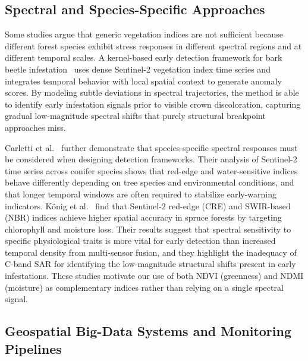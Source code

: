 \subsection{Spectral and Species-Specific Approaches}

Some studies argue that generic vegetation indices are not sufficient because different forest species exhibit stress responses in different spectral regions and at different temporal scales. A kernel-based early detection framework for bark beetle infestation~\cite{jamali2024} uses dense Sentinel-2 vegetation index time series and integrates temporal behavior with local spatial context to generate anomaly scores. By modeling subtle deviations in spectral trajectories, the method is able to identify early infestation signals prior to visible crown discoloration, capturing gradual low-magnitude spectral shifts that purely structural breakpoint approaches miss.

Carletti et al.~\cite{carletti2025} further demonstrate that species-specific spectral responses must be considered when designing detection frameworks. Their analysis of Sentinel-2 time series across conifer species shows that red-edge and water-sensitive indices behave differently depending on tree species and environmental conditions, and that longer temporal windows are often required to stabilize early-warning indicators. König et al.~\cite{konig2023} find that Sentinel-2 red-edge (CRE) and SWIR-based (NBR) indices achieve higher spatial accuracy in spruce forests by targeting chlorophyll and moisture loss. Their results suggest that spectral sensitivity to specific physiological traits is more vital for early detection than increased temporal density from multi-sensor fusion, and they highlight the inadequacy of C-band SAR for identifying the low-magnitude structural shifts present in early infestations. These studies motivate our use of both NDVI (greenness) and NDMI (moisture) as complementary indices rather than relying on a single spectral signal.



\subsection{Geospatial Big-Data Systems and Monitoring Pipelines}

